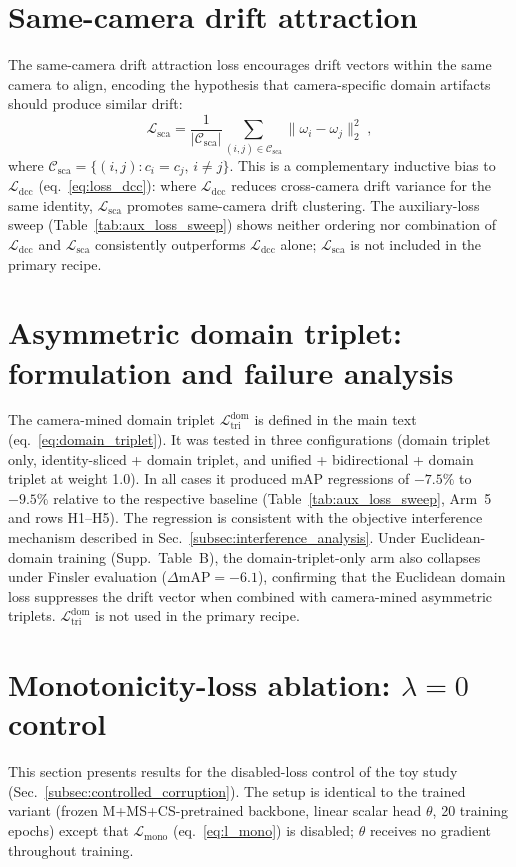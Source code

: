 \section{Same-camera drift attraction} \label{sec:suppl_sca}
The same-camera drift attraction loss encourages drift vectors within the same camera to align, encoding the hypothesis that camera-specific domain artifacts should produce similar drift:
\begin{equation}
    \mathcal{L}_{\mathrm{sca}} = \frac{1}{|\mathcal{C}_{\mathrm{sca}}|}\sum_{(i,j)\in\mathcal{C}_{\mathrm{sca}}} \|\omega_i - \omega_j\|_2^2 \;,
    \label{eq:sca}
\end{equation}
where $\mathcal{C}_{\mathrm{sca}} = \{(i,j): c_i=c_j,\, i\neq j\}$. This is a complementary inductive bias to $\mathcal{L}_{\mathrm{dcc}}$ (eq.~\ref{eq:loss_dcc}): where $\mathcal{L}_{\mathrm{dcc}}$ reduces cross-camera drift variance for the same identity, $\mathcal{L}_{\mathrm{sca}}$ promotes same-camera drift clustering. The auxiliary-loss sweep (Table~\ref{tab:aux_loss_sweep}) shows neither ordering nor combination of $\mathcal{L}_{\mathrm{dcc}}$ and $\mathcal{L}_{\mathrm{sca}}$ consistently outperforms $\mathcal{L}_{\mathrm{dcc}}$ alone; $\mathcal{L}_{\mathrm{sca}}$ is not included in the primary recipe.

\section{Asymmetric domain triplet: formulation and failure analysis} \label{sec:suppl_domain_triplet}
The camera-mined domain triplet $\mathcal{L}_{\mathrm{tri}}^{\mathrm{dom}}$ is defined in the main text (eq.~\ref{eq:domain_triplet}). It was tested in three configurations (domain triplet only, identity-sliced + domain triplet, and unified + bidirectional + domain triplet at weight 1.0). In all cases it produced mAP regressions of $-7.5\%$ to $-9.5\%$ relative to the respective baseline (Table~\ref{tab:aux_loss_sweep}, Arm~5 and rows H1--H5). The regression is consistent with the objective interference mechanism described in Sec.~\ref{subsec:interference_analysis}. Under Euclidean-domain training (Supp.~Table~B), the domain-triplet-only arm also collapses under Finsler evaluation ($\Delta\mathrm{mAP}{=}{-}6.1$), confirming that the Euclidean domain loss suppresses the drift vector when combined with camera-mined asymmetric triplets. $\mathcal{L}_{\mathrm{tri}}^{\mathrm{dom}}$ is not used in the primary recipe.


\section{Monotonicity-loss ablation: \texorpdfstring{$\lambda\!=\!0$}{lambda=0} control} \label{sec:suppl_m2b_ablation}
This section presents results for the disabled-loss control of the toy study (Sec.~\ref{subsec:controlled_corruption}). The setup is identical to the trained variant (frozen M+MS+CS-pretrained backbone, linear scalar head $\theta$, 20 training epochs) except that $\mathcal{L}_{\mathrm{mono}}$ (eq.~\ref{eq:l_mono}) is disabled; $\theta$ receives no gradient throughout training.

